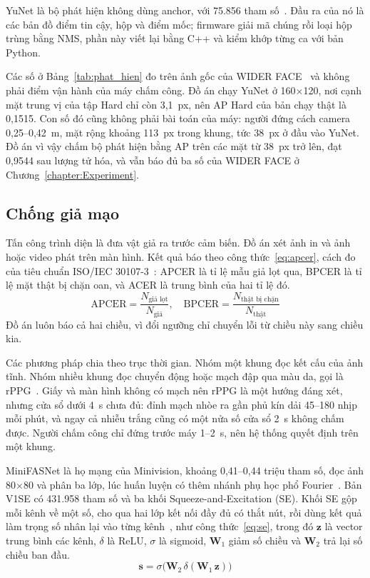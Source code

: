 \documentclass[../DoAn.tex]{subfiles}
\begin{document}
YuNet là bộ phát hiện không dùng anchor, với 75.856 tham số~\cite{yunet2023}. Đầu
ra của nó là các bản đồ điểm tin cậy, hộp và điểm mốc; firmware giải mã chúng rồi
loại hộp trùng bằng NMS, phần này viết lại bằng C++ và kiểm khớp từng ca với bản
Python.

Các số ở Bảng~\ref{tab:phat_hien} đo trên ảnh gốc của WIDER FACE~\cite{wider} và
không phải điểm vận hành của máy chấm công. Đồ án chạy YuNet ở 160$\times$120,
nơi cạnh mặt trung vị của tập Hard chỉ còn 3,1~px, nên AP Hard của bản chạy thật
là 0,1515. Con số đó cũng không phải bài toán của máy: người đứng cách camera
0,25--0,42~m, mặt rộng khoảng 113~px trong khung, tức 38~px ở đầu vào YuNet.
Đồ án vì vậy chấm bộ phát hiện bằng AP trên các mặt từ 38~px trở lên, đạt 0,9544
sau lượng tử hóa, và vẫn báo đủ ba số của WIDER FACE ở
Chương~\ref{chapter:Experiment}.

\subsection{Chống giả mạo}
\label{section:2.3.2}

Tấn công trình diện là đưa vật giả ra trước cảm biến. Đồ án xét ảnh in và ảnh
hoặc video phát trên màn hình. Kết quả báo theo công thức~\eqref{eq:apcer}, cách
đo của tiêu chuẩn ISO/IEC 30107-3~\cite{yu2023fas}: APCER là tỉ lệ mẫu giả lọt
qua, BPCER là tỉ lệ mặt thật bị chặn oan, và ACER là trung bình của hai tỉ lệ đó.
\begin{equation}
\mathrm{APCER} = \frac{N_{\text{giả lọt}}}{N_{\text{giả}}}, \quad
\mathrm{BPCER} = \frac{N_{\text{thật bị chặn}}}{N_{\text{thật}}}
\label{eq:apcer}
\end{equation}
Đồ án luôn báo cả hai chiều, vì đổi ngưỡng chỉ chuyển lỗi từ chiều này sang chiều
kia.

Các phương pháp chia theo trục thời gian. Nhóm một khung đọc kết cấu của ảnh tĩnh.
Nhóm nhiều khung đọc chuyển động hoặc mạch đập qua màu da, gọi là
rPPG~\cite{yu2023fas}. Giấy và màn hình không có mạch nên rPPG là một hướng đáng xét, nhưng cửa sổ dưới 4~s chưa đủ: đỉnh
mạch nhòe ra gần phủ kín dải 45--180 nhịp mỗi phút, và ngay cả nhiễu trắng cũng
có một nửa số cửa sổ 2~s không chấm được. Người chấm công chỉ đứng trước máy
1--2~s, nên hệ thống quyết định trên một khung.

MiniFASNet là họ mạng của Minivision, khoảng 0,41--0,44 triệu tham số, đọc ảnh
80$\times$80 và phân ba lớp, lúc huấn luyện có thêm nhánh phụ học phổ
Fourier~\cite{minifas}. Bản V1SE có 431.958 tham số và ba khối
Squeeze-and-Excitation (SE). Khối SE gộp mỗi kênh về một số, cho qua hai lớp kết
nối đầy đủ có thắt nút, rồi dùng kết quả làm trọng số nhân lại vào từng
kênh~\cite{senet}, như công thức~\eqref{eq:se}, trong đó $\mathbf{z}$ là vector
trung bình các kênh, $\delta$ là ReLU, $\sigma$ là sigmoid, $\mathbf{W}_1$ giảm số
chiều và $\mathbf{W}_2$ trả lại số chiều ban đầu.
\begin{equation}
\mathbf{s} = \sigma\bigl(\mathbf{W}_2\,\delta(\mathbf{W}_1\,\mathbf{z})\bigr)
\label{eq:se}
\end{equation}
\end{document}
